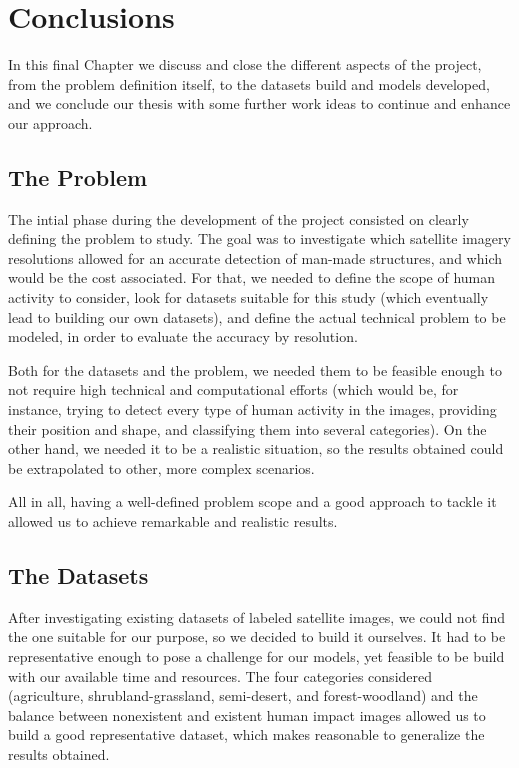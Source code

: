 
\chapter{Conclusions}

\label{Chapter6}


In this final Chapter we discuss and close the different aspects of the project, from the problem definition itself, to the datasets build and models developed, and we conclude our thesis with some further work ideas to continue and enhance our approach.

\section{The Problem}

The intial phase during the development of the project consisted on clearly defining the problem to study. The goal was to investigate which satellite imagery resolutions allowed for an accurate detection of man-made structures, and which would be the cost associated. For that, we needed to define the scope of human activity to consider, look for datasets suitable for this study (which eventually lead to building our own datasets), and define the actual technical problem to be modeled, in order to evaluate the accuracy by resolution. 

Both for the datasets and the problem, we needed them to be feasible enough to not require high technical and computational efforts (which would be, for instance, trying to detect every type of human activity in the images, providing their position and shape, and classifying them into several categories). On the other hand, we needed it to be a realistic situation, so the results obtained could be extrapolated to other, more complex scenarios.

All in all, having a well-defined problem scope and a good approach to tackle it allowed us to achieve remarkable and realistic results.

\section{The Datasets}

After investigating existing datasets of labeled satellite images, we could not find the one suitable for our purpose, so we decided to build it ourselves. It had to be representative enough to pose a challenge for our models, yet feasible to be build with our available time and resources. The four categories considered (agriculture, shrubland-grassland, semi-desert, and forest-woodland) and the balance between nonexistent and existent human impact images allowed us to build a good representative dataset, which makes reasonable to generalize the results obtained.

